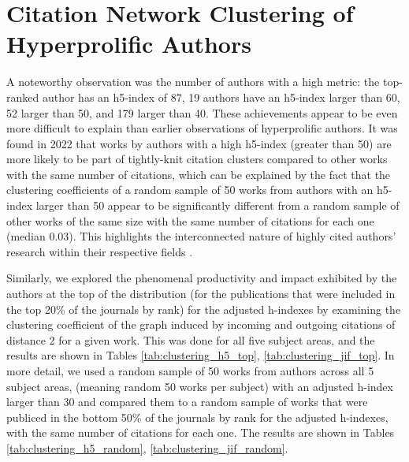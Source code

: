 \section{Citation Network Clustering of Hyperprolific Authors}

A noteworthy observation was the number of authors with a high metric: the
top-ranked author has an h5-index of 87, 19 authors have an h5-index larger
than 60, 52 larger than 50, and 179 larger than 40. These achievements appear
to be even more difficult to explain than earlier observations of hyperprolific
authors. It was found in 2022 that works by authors with a high h5-index
(greater than 50) are more likely to be part of tightly-knit citation clusters
compared to other works with the same number of citations, which can be
explained by the fact that the clustering coefficients of a random sample of 50
works from authors with an h5-index larger than 50 appear to be significantly
different from a random sample of other works of the same size with the same
number of citations for each one (median 0.03). This highlights the
interconnected nature of highly cited authors' research within their respective
fields \cite{Spi23g}.

Similarly, we explored the phenomenal productivity and impact exhibited by the
authors at the top of the distribution (for the publications that were included
in the top 20\% of the journals by rank) for the adjusted h-indexes by
examining the clustering coefficient of the graph induced by incoming and
outgoing citations of distance 2 for a given work. This was done for all five
subject areas, and the results are shown in Tables \ref{tab:clustering_h5_top},
\ref{tab:clustering_jif_top}. In more detail, we used a random sample of 50
works from authors across all 5 subject areas, (meaning random 50 works per
subject) with an adjusted h-index larger than 30 and compared them to a random
sample of works that were publiced in the bottom 50\% of the journals by rank
for the adjusted h-indexes, with the same number of citations for each one. The
results are shown in Tables \ref{tab:clustering_h5_random},
\ref{tab:clustering_jif_random}.

